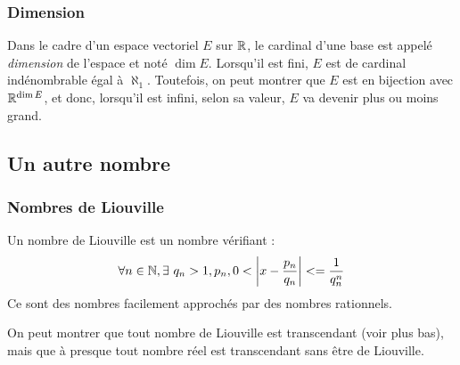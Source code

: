 \documentclass{beamercours}
\begin{document}
\begin{frame}
    \frametitle{Dimension}
    Dans le cadre d'un espace vectoriel $E$ sur $\mathbb{R}$, le cardinal d'une base est appelé \emph{dimension} de l'espace et noté $\dim E$. Lorsqu'il est fini, $E$ est de cardinal indénombrable égal à $\aleph_{1}$. Toutefois, on peut montrer que $E$ est en bijection avec $\mathbb{R}^{\dim E}$, et donc, lorsqu'il est infini, selon sa valeur, $E$ va devenir plus ou moins grand.




\end{frame}

\subsection{Un autre nombre}

\begin{frame}
    \frametitle{Nombres de Liouville}
    Un nombre de Liouville est un nombre vérifiant : 
    \[
        \forall n \in \mathbb{N}, \exists\ q_{n} > 1, p_{n}, 0 < \left|x - \frac{p_{n}}{q_{n}}\right| <= \frac{1}{q_{n}^{n}}
    \]
    Ce sont des nombres facilement approchés par des nombres rationnels.

    On peut montrer que tout nombre de Liouville est transcendant (voir plus bas), mais que à presque tout nombre réel est transcendant sans être de Liouville.
\end{frame}
\end{document}
